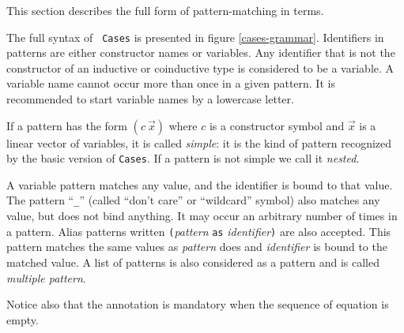 {}

\label{Mult-match-full}

This section describes the full form of pattern-matching in {\Coq} terms.

\label{implementation} The full syntax of {\tt
Cases} is presented in figure \ref{cases-grammar}.  Identifiers in
patterns are either constructor names or variables. Any identifier
that is not the constructor of an inductive or coinductive type is
considered to be a variable. A variable name cannot occur more than
once in a given pattern. It is recommended to start variable names by
a lowercase letter.

If a pattern has the form $(c~\vec{x})$ where $c$ is a constructor
symbol and $\vec{x}$ is a linear vector of variables, it is called
{\em simple}: it is the kind of pattern recognized by the basic
version of {\tt Cases}. If a pattern is
not simple we call it {\em nested}.

A variable pattern matches any value, and the identifier is bound to
that value. The pattern ``\texttt{\_}'' (called ``don't care'' or
``wildcard'' symbol) also matches any value, but does not bind anything. It
may occur an arbitrary number of times in a pattern. Alias patterns
written \texttt{(}{\sl pattern} \texttt{as} {\sl identifier}\texttt{)} are
also accepted. This pattern matches the same values as {\sl pattern}
does and {\sl identifier} is bound to the matched value.  A list of
patterns is also considered as a pattern and is called {\em multiple
pattern}.

Notice also that the annotation is mandatory when the sequence of equation is
empty.

